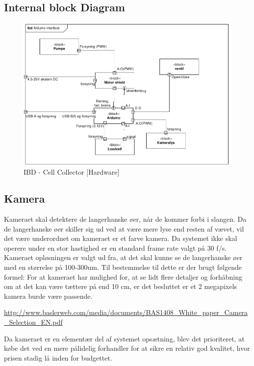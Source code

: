 \subsection{Internal block Diagram} 
\begin{figure}[H]
	\centering
	\includegraphics[width=1\textwidth]{pdf/IBD_Hardware(Arduino)_cropped.pdf}
	\caption{IBD - Cell Collector [Hardware]}
	\label{fig:ibd_Hardware}
\end{figure}



\subsection{Kamera}
Kameraet skal detektere de langerhanske øer, når de kommer forbi i slangen.  Da de langerhanske øer skiller sig ud ved at være mere lyse end resten af vævet, vil det være underordnet om kameraet er et farve kamera. Da systemet ikke skal operere under en stor hastighed er en standard frame rate valgt på 30 f/s. Kameraet opløsningen er valgt ud fra, at det skal kunne se de langerhanske øer med en størrelse på 100-300um. Til bestemmelse til dette er der brugt følgende formel:
For at kameraet har mulighed for, at se lidt flere detaljer og forhåbning om at det kan være tættere på end 10 cm, er det besluttet er et 2 megapixels kamera burde være passende.

\url{http://www.baslerweb.com/media/documents/BAS1408_White_paper_Camera_Selection_EN.pdf}


Da kameraet er en elementær del af systemet opsætning, blev det prioriteret, at købe det ved en mere pålidelig forhandler for at sikre en relativ god kvalitet, hvor prisen stadig lå inden for budgettet.  

